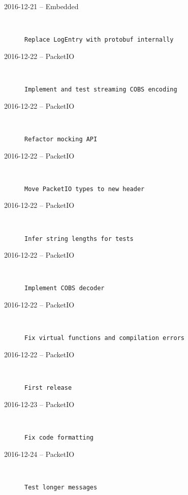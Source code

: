 \begin{description}
  \item[2016-12-21 -- Embedded] \hfill \
\begin{lstlisting}
Replace LogEntry with protobuf internally
\end{lstlisting}


  \item[2016-12-22 -- PacketIO] \hfill \
\begin{lstlisting}
Implement and test streaming COBS encoding
\end{lstlisting}


  \item[2016-12-22 -- PacketIO] \hfill \
\begin{lstlisting}
Refactor mocking API
\end{lstlisting}


  \item[2016-12-22 -- PacketIO] \hfill \
\begin{lstlisting}
Move PacketIO types to new header
\end{lstlisting}


  \item[2016-12-22 -- PacketIO] \hfill \
\begin{lstlisting}
Infer string lengths for tests
\end{lstlisting}


  \item[2016-12-22 -- PacketIO] \hfill \
\begin{lstlisting}
Implement COBS decoder
\end{lstlisting}


  \item[2016-12-22 -- PacketIO] \hfill \
\begin{lstlisting}
Fix virtual functions and compilation errors
\end{lstlisting}


  \item[2016-12-22 -- PacketIO] \hfill \
\begin{lstlisting}
First release
\end{lstlisting}


  \item[2016-12-23 -- PacketIO] \hfill \
\begin{lstlisting}
Fix code formatting
\end{lstlisting}


  \item[2016-12-24 -- PacketIO] \hfill \
\begin{lstlisting}
Test longer messages
\end{lstlisting}



\end{description}

